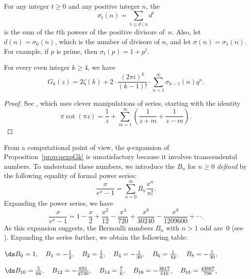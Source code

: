\begin{definition}[Sigma]
For any integer $t\geq 0$ and any positive integer $n$, 
the  
$$
  \sigma_t(n) = \sum_{1\leq d \mid n} d^t
$$
is the sum of the $t$th powers of the positive divisors of~$n$.
Also, let $d(n) = \sigma_0(n)$, which is the number
of divisors of $n$, and let $\sigma(n) = \sigma_1(n)$.
For example, if $p$ is prime, then $\sigma_t(p) = 1 + p^t$.
\end{definition}

\begin{proposition}\label{prop:qexpGk}
For every even integer $k\geq 4$, we have
$$
  G_k(z) = 2\zeta(k) + 2\cdot \frac{(2\pi i)^{k}}{(k-1)!}\cdot
     \sum_{n=1}^{\infty} \sigma_{k-1}(n) q^n.
$$
\end{proposition}
\begin{proof}
  See \cite[Section~VII.4]{serre:arithmetic}, which uses clever
  manipulations of series, starting with the identity
$$
  \pi \cot(\pi z) = \frac{1}{z} + \sum_{m=1}^{\infty} 
     \left( \frac{1}{z+m} + \frac{1}{z-m}\right).
$$
\end{proof}

From a computational point of view, the $q$-expansion of
Proposition~\ref{prop:qexpGk} is unsatisfactory because it involves
transcendental numbers.  To understand these numbers, we introduce the
 $B_n$ for $n\geq 0$ {\em defined} by the
following equality of formal power series:
\begin{equation}\label{eqn:def_bernoulli}
  \frac{x}{e^x - 1} = \sum_{n=0}^{\infty} B_n \frac{x^n}{n!}.
\end{equation}
Expanding the power series, we have 
$$
\frac{x}{e^x - 1} =
1 - \frac{x}{2} + \frac{x^2}{12} - \frac{x^4}{720} + \frac{x^6}{30240}
- \frac{x^8}{1209600} + \cdots. $$
As this expansion suggests, the
Bernoulli numbers $B_n$ with $n>1$ odd are~$0$ (see
).
Expanding the series further, we obtain the following table:
\vspace{0.5ex}

\noindent{}$\ds B_{0}=1,\quad B_{1}=-\frac{1}{2},\quad B_{2}=\frac{1}{6},\quad
B_{4}=-\frac{1}{30},\quad B_{6}=\frac{1}{42},\quad
B_{8}=-\frac{1}{30},\quad $\vspace{1.5ex}

\noindent{}$\ds
B_{10}=\frac{5}{66},\quad
B_{12}=-\frac{691}{2730},\quad
B_{14}=\frac{7}{6},\quad
B_{16}=-\frac{3617}{510},\quad
B_{18}=\frac{43867}{798},\quad
$\vspace{1.5ex}

